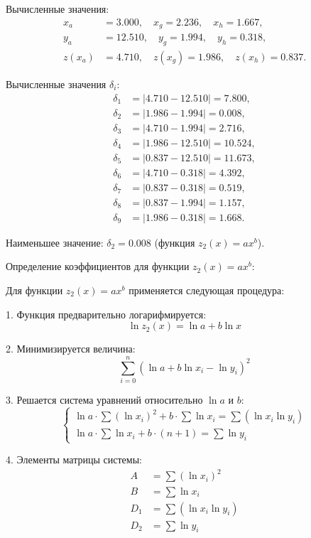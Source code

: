 \documentclass[a4paper, 14pt]{extarticle}
\begin{document}
Вычисленные значения:
\[
\begin{aligned}
x_a &= 3.000, \quad x_g = 2.236, \quad x_h = 1.667, \\
y_a &= 12.510, \quad y_g = 1.994, \quad y_h = 0.318, \\
z(x_a) &= 4.710, \quad z(x_g) = 1.986, \quad z(x_h) = 0.837.
\end{aligned}
\]

Вычисленные значения $\delta_i$:
\[
\begin{aligned}
\delta_1 &= |4.710 - 12.510| = 7.800, \\
\delta_2 &= |1.986 - 1.994| = 0.008, \\
\delta_3 &= |4.710 - 1.994| = 2.716, \\
\delta_4 &= |1.986 - 12.510| = 10.524, \\
\delta_5 &= |0.837 - 12.510| = 11.673, \\
\delta_6 &= |4.710 - 0.318| = 4.392, \\
\delta_7 &= |0.837 - 0.318| = 0.519, \\
\delta_8 &= |0.837 - 1.994| = 1.157, \\
\delta_9 &= |1.986 - 0.318| = 1.668.
\end{aligned}
\]

Наименьшее значение: \( \delta_2 = 0.008 \) (функция \( z_2(x) = ax^b \)).

Определение коэффициентов для функции \( z_2(x) = ax^b \):

Для функции \( z_2(x) = ax^b \) применяется следующая процедура:

1. Функция предварительно логарифмируется:
   \[
   \ln z_2(x) = \ln a + b \ln x
   \]

2. Минимизируется величина:
   \[
   \sum_{i=0}^{n} \left( \ln a + b \ln x_i - \ln y_i \right)^2
   \]

3. Решается система уравнений относительно \( \ln a \) и \( b \):
   \[
   \begin{cases}
   \ln a \cdot \sum (\ln x_i)^2 + b \cdot \sum \ln x_i = \sum (\ln x_i \ln y_i) \\
   \ln a \cdot \sum \ln x_i + b \cdot (n+1) = \sum \ln y_i
   \end{cases}
   \]

4. Элементы матрицы системы:
   \[
   \begin{aligned}
   A &= \sum (\ln x_i)^2 \\
   B &= \sum \ln x_i \\
   D_1 &= \sum (\ln x_i \ln y_i) \\
   D_2 &= \sum \ln y_i
   \end{aligned}
   \]
\end{document}
